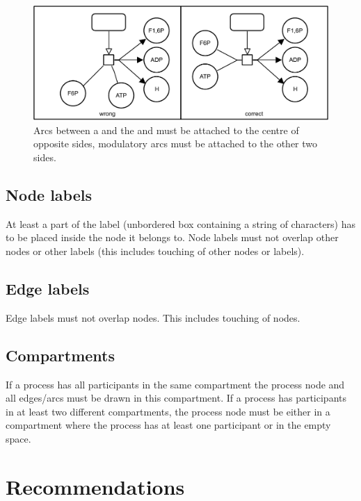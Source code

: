 \begin{figure}[htb]
  \centering
  \includegraphics[scale=0.8]{images/build/layout_connecting_arcs.pdf}
  \caption{Arcs between a   and the  and  must be attached to the centre of opposite sides, modulatory
  arcs must be attached to the other two sides.}\label{fig:layout6}
\end{figure}

\subsection{Node labels}

At least a part of the label (unbordered box containing a string of characters) has to be placed inside the node it belongs to. Node labels must not overlap other nodes or other labels (this includes touching of other nodes or labels).

\subsection{Edge labels}

Edge labels must not overlap nodes. This includes touching of nodes.

\subsection{Compartments}

If a process has all participants in the same compartment the process node and all edges/arcs must be drawn in this compartment.  If a process has participants in at least two different compartments, the process node must be either in a compartment where the process has at least one participant or in the empty space.

\section{Recommendations}

